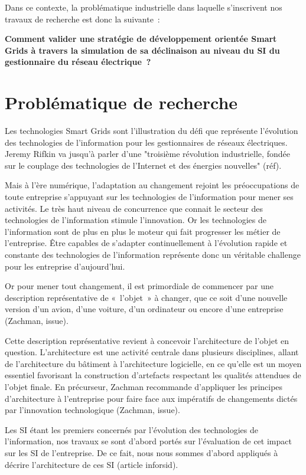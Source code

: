 Dans ce contexte, la problématique industrielle dans laquelle  s'inscrivent nos travaux de recherche est donc la suivante~: 

\textbf{Comment valider une stratégie de développement orientée Smart Grids à travers la simulation de sa déclinaison au niveau du SI du gestionnaire du réseau électrique~?}

 
\section{Problématique de recherche}

Les technologies Smart Grids sont l'illustration du défi que représente l'évolution des technologies de l'information pour les gestionnaires de réseaux électriques. Jeremy Rifkin va jusqu'à parler d'une "troisième révolution industrielle, fondée sur le couplage des technologies de l’Internet et des énergies nouvelles" (réf). 

Mais à l'ère numérique, l'adaptation au changement rejoint les préoccupations de toute entreprise s'appuyant sur les technologies de l'information pour mener ses activités. Le très haut niveau de concurrence que connait le secteur des technologies de l'information stimule l'innovation. Or les technologies de l'information sont de plus en plus le moteur qui fait progresser les  métier de l'entreprise. Être capables de s'adapter continuellement à l'évolution rapide et constante des technologies de l'information représente donc un véritable challenge pour les entreprise d'aujourd'hui. 

Or pour mener tout changement, il est primordiale de commencer par une description représentative de «~l'objet~» à changer, que ce soit d'une nouvelle version d'un avion, d'une voiture, d'un ordinateur ou encore d'une entreprise  (Zachman, issue).

Cette description représentative revient à concevoir l'architecture de l'objet en question. L'architecture est une activité centrale dans plusieurs disciplines, allant de l'architecture du bâtiment à l'architecture logicielle, en ce qu'elle est un moyen essentiel favorisant la construction d'artefacts respectant les qualités attendues de l'objet finale. En précurseur, Zachman recommande d'appliquer les principes d'architecture à l'entreprise pour faire face aux impératifs de changements dictés par l'innovation technologique (Zachman, issue).

Les SI étant les premiers concernés par l'évolution des technologies de l'information, nos travaux se sont d'abord portés sur l'évaluation de cet impact sur les SI de l'entreprise. De ce fait, nous nous sommes d'abord appliqués à décrire l'architecture de ces SI (article inforsid). 

